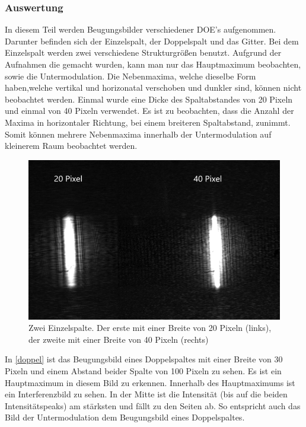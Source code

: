\subsubsection{Auswertung}
In diesem Teil werden Beugungsbilder verschiedener DOE's aufgenommen. Darunter befinden sich der Einzelspalt, der Doppelspalt und das Gitter. Bei dem Einzelspalt werden zwei verschiedene Strukturgrößen benutzt. Aufgrund der Aufnahmen die gemacht wurden, kann man nur das Hauptmaximum beobachten, sowie die Untermodulation. Die Nebenmaxima, welche dieselbe Form haben,welche vertikal und horizonatal verschoben und dunkler sind, können nicht beobachtet werden. 
Einmal wurde eine Dicke des Spaltabstandes von 20 Pixeln und einmal von 40 Pixeln verwendet. Es ist zu beobachten, dass die Anzahl der Maxima in horizontaler Richtung, bei einem breiteren Spaltabstand, zunimmt. Somit können mehrere Nebenmaxima innerhalb der Untermodulation auf kleinerem Raum beobachtet werden.
\begin{figure}[h!]
	\centering
	\includegraphics[scale = 1]{pixelverg.png}
	\caption{Zwei Einzelspalte. Der erste mit einer Breite von 20 Pixeln (links), der zweite mit einer Breite von 40 Pixeln (rechts)}
	\label{verg}
\end{figure}
In \cref{doppel} ist das Beugungsbild eines Doppelspaltes mit einer Breite von 30 Pixeln und einem Abstand beider Spalte von 100 Pixeln zu sehen. Es ist ein Hauptmaximum in diesem Bild zu erkennen. Innerhalb des Hauptmaximums ist ein Interferenzbild zu sehen. In der Mitte ist die Intensität (bis auf die beiden Intensitätspeaks) am stärksten und fällt zu den Seiten ab. So entspricht auch das Bild der Untermodulation dem Beugungsbild eines Doppelspaltes.
